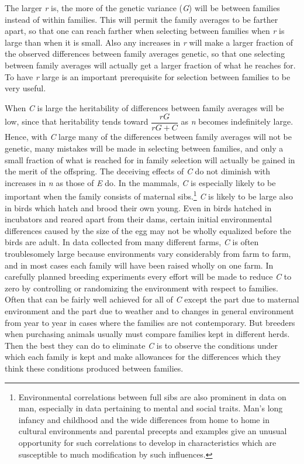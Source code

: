 The larger \textit{r} is, the more of the genetic variance (\textit{G}) will be between
families instead of within families. This will permit the family averages
to be farther apart, so that one can reach farther when selecting
between families when \textit{r} is large than when it is small. Also any
increases in \textit{r} will make a larger fraction of the observed differences
between family averages genetic, so that one selecting between family
averages will actually get a larger fraction of what he reaches for. To
have \textit{r} large is an important prerequisite for selection between families
to be very useful.

When \textit{C} is large the heritability of differences between family averages
will be low, since that heritability tends toward $\dfrac{rG}{rG + C}$ as \textit{n}
becomes indefinitely large. Hence, with \textit{C} large many of the differences
between family averages will not be genetic, many mistakes will be
made in selecting between families, and only a small fraction of what is
reached for in family selection will actually be gained in the merit of
the offspring. The deceiving effects of \textit{C} do not diminish with increases
in \textit{n} as those of \textit{E} do. In the mammals, \textit{C} is especially
likely to be important when the family consists of maternal sibs.\footnote{Environmental
correlations between full sibs are also prominent in data on
man, especially in data pertaining to mental and social traits. Man's long infancy and
childhood and the wide differences from home to home in cultural environments and
parental precepts and examples give an unusual opportunity for such correlations
to develop in characteristics which are susceptible to much modification by such
influences.} \textit{C} is likely to be large
also in birds which hatch and brood their own young. Even in birds
hatched in incubators and reared apart from their dams, certain initial
environmental differences caused by the size of the egg may not be
wholly equalized before the birds are adult. In data collected from
many different farms, \textit{C} is often troublesomely large because environments
vary considerably from farm to farm, and in most cases each family
will have been raised wholly on one farm. In carefully planned
breeding experiments every effort will be made to reduce \textit{C} to zero by
controlling or randomizing the environment with respect to families.
Often that can be fairly well achieved for all of \textit{C} except the part due to
maternal environment and the part due to weather and to changes in
general environment from year to year in cases where the families are
not contemporary. But breeders when purchasing animals usually must
compare families kept in different herds. Then the best they can do to
eliminate \textit{C} is to observe the conditions under which each family is kept
and make allowances for the differences which they think these conditions
produced between families.

